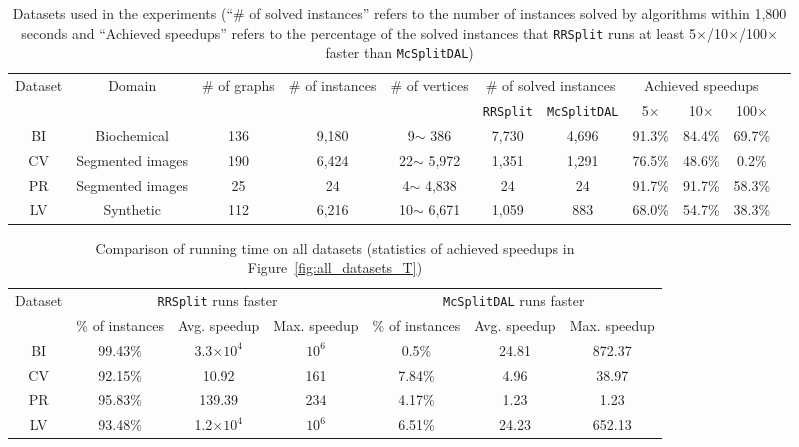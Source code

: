 \begin{table*}[]
    \centering
    \caption{\Yui Datasets used in the experiments (``\# of solved instances'' refers to the number of instances solved by algorithms within 1,800 seconds and ``Achieved speedups'' refers to the percentage of the solved instances that \texttt{RRSplit} runs at least 5$\times$/10$\times$/100$\times$ faster than \texttt{McSplitDAL})}
    \vspace{-0.15in}
    \begin{tabular}{|c|c|c|c|c|c|c|c|c|c|c|}
        \hline
        \multirow{2}{*}{Dataset} & \multirow{2}{*}{Domain} & \multirow{2}{*}{\# of graphs} & \multirow{2}{*}{\# of instances} & \multirow{2}{*}{\# of vertices} & \multicolumn{2}{c|}{\# of solved instances} & \multicolumn{3}{c|}{Achieved speedups} \\
        \cline{6-10}
        & & & & & \texttt{RRSplit} & \texttt{McSplitDAL} & 5$\times$ & 10$\times$ & 100$\times$\\
        \hline
        \textsf{BI} & Biochemical & 136 & 9,180 & 9$\sim$ 386 & 7,730 & 4,696 & 91.3\% & 84.4\% & 69.7\% \\
        \textsf{CV} & Segmented images & 190 & 6,424 & 22$\sim$ 5,972 & 1,351 & 1,291& 76.5\% & 48.6\% & 0.2\% \\
        \textsf{PR} & Segmented images & 25& 24& 4$\sim$ 4,838  & 24 & 24 & 91.7\% & 91.7\% & 58.3\% \\
        \textsf{LV} & Synthetic & 112 & 6,216& 10$\sim$ 6,671 & 1,059 & 883 & 68.0\% & 54.7\% & 38.3\%\\
        \hline
    \end{tabular}
    
    \label{tab:my_label}
\end{table*}

\begin{table*}[]
    \centering
    \caption{\YuiR Comparison of running time on all datasets (statistics of achieved speedups in Figure~\ref{fig:all_datasets_T})}
    \vspace{-0.15in}
    \begin{tabular}{|c|c|c|c|c|c|c|}
        \hline
        \multirow{2}{*}{Dataset} & \multicolumn{3}{c|}{\texttt{RRSplit} runs faster} & \multicolumn{3}{c|}{\texttt{McSplitDAL} runs faster} \\
        \cline{2-7}
        & \% of instances & Avg. speedup & Max. speedup & \% of instances & Avg. speedup & Max. speedup\\
        \hline
        BI& 99.43\% & 3.3$\times 10^4$ & $10^6$ & 0.5\% & 24.81 & 872.37 \\
        CV& 92.15\% & 10.92 & 161 & 7.84\% & 4.96 & 38.97 \\
        PR& 95.83\% & 139.39 & 234 & 4.17\% & 1.23 & 1.23 \\
        LV& 93.48\% & 1.2$\times 10^4$ & $10^6$ & 6.51\% & 24.23 & 652.13 \\
        \hline
    \end{tabular}
    
    \label{tab:results}
\end{table*}

